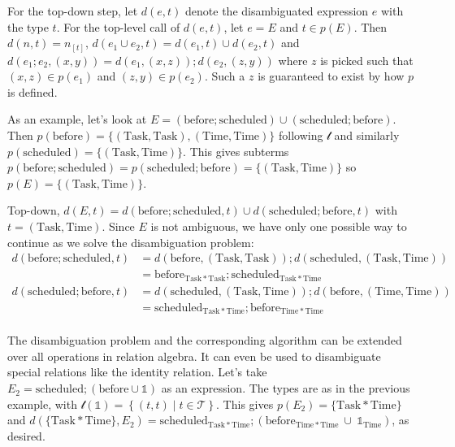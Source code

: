 \documentclass[12pt]{article}
\begin{document}
For the top-down step, let $d(e,t)$ denote the disambiguated expression $e$ with the type $t$.
For the top-level call of $d(e,t)$, let $e=E$ and $t\in p(E)$.
Then $d(n,t) = n_{[t]}$, $d(e_1 \cup e_2, t) = d(e_1,t) \cup d(e_2,t)$ and $d(e_1 ; e_2, (x,y)) = d(e_1, (x,z)) ; d(e_2, (z,y))$ where $z$ is picked such that $(x,z)\in p(e_1)$ and $(z,y)\in p(e_2)$.
Such a $z$ is guaranteed to exist by how $p$ is defined.

As an example, let's look at $E = (\mathrm{before};\mathrm{scheduled}) \cup (\mathrm{scheduled};\mathrm{before})$.
Then $p(\mathrm{before}) =  \{(\mathrm{Task}, \mathrm{Task}),(\mathrm{Time}, \mathrm{Time})\}$ following $\mathcal{t}$ and similarly $p(\mathrm{scheduled}) = \{(\mathrm{Task}, \mathrm{Time})\}$.
This gives subterms $p(\mathrm{before};\mathrm{scheduled}) = p(\mathrm{scheduled};\mathrm{before}) = \{(\mathrm{Task}, \mathrm{Time})\}$ so $p(E) = \{(\mathrm{Task}, \mathrm{Time})\}$.

Top-down, $d(E,t) = d(\mathrm{before};\mathrm{scheduled},t) \cup d(\mathrm{scheduled};\mathrm{before},t)$ with $t=(\mathrm{Task}, \mathrm{Time})$.
Since $E$ is not ambiguous, we have only one possible way to continue as we solve the disambiguation problem:
\begin{align*}d(\mathrm{before};\mathrm{scheduled},t) &= d(\mathrm{before},(\mathrm{Task}, \mathrm{Task})) ;  d(\mathrm{scheduled},(\mathrm{Task}, \mathrm{Time})) \\
&=\mathrm{before}_{\mathrm{Task} * \mathrm{Task}}; \mathrm{scheduled}_{\mathrm{Task}* \mathrm{Time}}\\
d(\mathrm{scheduled};\mathrm{before},t) &=  d(\mathrm{scheduled},(\mathrm{Task}, \mathrm{Time}));d(\mathrm{before},(\mathrm{Time}, \mathrm{Time}))\\
&=\mathrm{scheduled}_{\mathrm{Task} * \mathrm{Time}}; \mathrm{before}_{\mathrm{Time}* \mathrm{Time}}\\
\end{align*}

The disambiguation problem and the corresponding algorithm can be extended over all operations in relation algebra.
It can even be used to disambiguate special relations like the identity relation.
Let's take $E_2 = \mathrm{scheduled};(\mathrm{before} \cup \mathbb{1})$ as an expression.
The types are as in the previous example, with $\mathcal{t}(\mathbb{1}) = \left\{(t,t)\mid t\in \mathcal{T}\right\}$.
This gives $p(E_2) = \{\mathrm{Task} * \mathrm{Time}\}$ and $d(\{\mathrm{Task} * \mathrm{Time}\},E_2) = \mathrm{scheduled}_{\mathrm{Task} * \mathrm{Time}};(\mathrm{before}_{\mathrm{Time} * \mathrm{Time}}\ \cup\ \mathbb{1}_{\mathrm{Time}})$, as desired.
\end{document}
